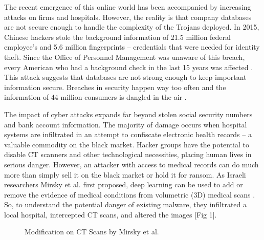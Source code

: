The recent emergence of this online world has been accompanied by increasing attacks on firms and hospitals. However, the reality is that company databases are not secure enough to handle the complexity of the Trojans deployed. In 2015, Chinese hackers stole the background information of 21.5 million federal employee's and 5.6 million fingerprints -- credentials that were needed for identity theft. Since the Office of Personnel Management was unaware of this breach, every American who had a background check in the last 15 years was affected \cite{gootman_opm_2016}. This attack suggests that databases are not strong enough to keep important information secure. Breaches in security happen way too often and the information of 44 million consumers is dangled in the air \cite{rachwald_is_2008}. 
\vspace{1mm}

The impact of cyber attacks expands far beyond stolen social security numbers and bank account information. The majority of damage occurs when hospital systems are infiltrated in an attempt to confiscate electronic health records -- a valuable commodity on the black market. Hacker groups have the potential to disable CT scanners and other technological necessities, placing human lives in serious danger. However, an attacker with access to medical records can do much more than simply sell it on the black market or hold it for ransom. As Israeli researchers Mirsky et al. \cite{mirsky_ct-gan_2019} first proposed, deep learning can be used to add or remove the evidence of medical conditions from volumetric (3D) medical scans \cite{mirsky_ct-gan_2019}. So, to understand the potential danger of existing malware, they infiltrated a local hospital, intercepted CT scans, and altered the images [Fig 1]. 

\begin{figure}[ht]%
    \centering
    \qquad
    \caption{Modification on CT Scans by Mirsky et al. \cite{mirsky_ct-gan_2019}}%
    \label{fig:example}%
\end{figure}
 \\

